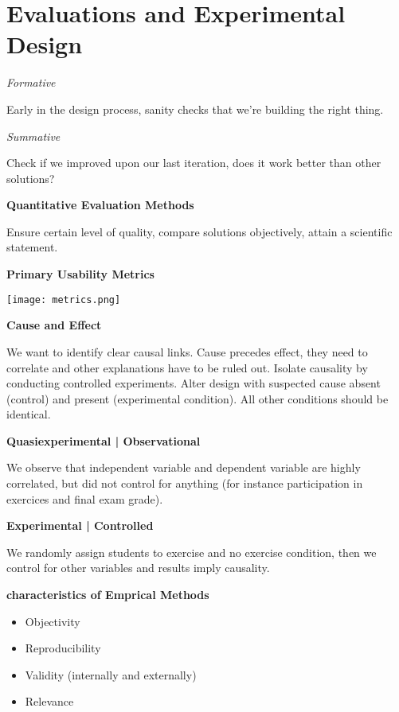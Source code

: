 \section{Evaluations and Experimental Design}

\textit{Formative} \smallskip 

Early in the design process, sanity checks that we're building the right thing. 

\textit{Summative} \smallskip

Check if we improved upon our last iteration, does it work better than other solutions? \medskip

\textbf{Quantitative Evaluation Methods} \smallskip

Ensure certain level of quality, compare solutions objectively, attain a scientific statement. \medskip

\textbf{Primary Usability Metrics} \smallskip

\begin{center}
	\texttt{[image: metrics.png]}
\end{center}

\columnbreak

\textbf{Cause and Effect} \smallskip

We want to identify clear causal links. Cause precedes effect, they need to correlate and other explanations have to be ruled out. 
Isolate causality by conducting controlled experiments. Alter design with suspected cause absent (control) and present (experimental condition).
All other conditions should be identical. \medskip

\textbf{Quasiexperimental | Observational} \smallskip

We observe that independent variable and dependent variable are highly correlated, but did not control for anything (for instance participation in exercices and final exam grade). \medskip

\textbf{Experimental | Controlled} \smallskip

We randomly assign students to exercise and no exercise condition, then we control for other variables and results imply causality. \medskip


\textbf{characteristics of Emprical Methods}

\begin{itemize}
    \item Objectivity
    \item Reproducibility
    \item Validity (internally and externally)
    \item Relevance
\end{itemize}

